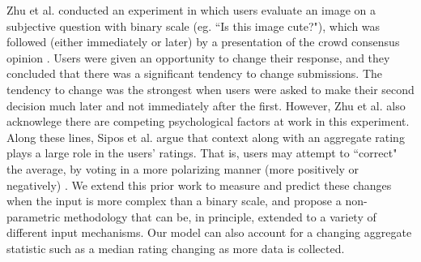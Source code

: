 Zhu et al. conducted an experiment in which users evaluate an image on a subjective question with binary scale (eg. ``Is this image cute?"), which was followed (either immediately or later) by a presentation of the crowd consensus opinion \cite{zhu2012switch}. 
Users were given an opportunity to change their response, and they concluded that there was a significant tendency to change submissions.
The tendency to change was the strongest when users were asked to make their second decision much later and not immediately after the first.
However, Zhu et al. also acknowlege there are competing psychological factors at work in this experiment.
Along these lines, Sipos et al. argue that context along with an aggregate rating plays a large role in the users' ratings. That is, users may attempt to ``correct" the average, by voting in a more polarizing manner (more positively or negatively) \cite{siposreview}.
We extend this prior work to measure and predict these changes when the input is more complex than a binary scale, and propose a non-parametric methodology that can be, in principle, extended to a variety of different input mechanisms.
Our model can also account for a changing aggregate statistic such as a median rating changing as more data is collected. 





